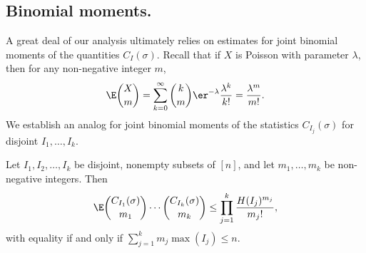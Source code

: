 \subsection{Binomial moments.}
A great deal of our analysis ultimately relies on
estimates for joint binomial moments of the quantities
$C_I(\sigma)$.  Recall that if $X$
is Poisson with parameter $\lambda$,
then for any non-negative integer $m$,
\[
\E \binom{X}{m} = 
\sum_{k=0}^\infty \binom{k}{m} \er^{-\lambda} \frac{\lambda^k}{k!}= \frac{\lambda^m}{m!}.
\]
We establish an analog for joint binomial moments of the statistics
$C_{I_j}(\sigma)$ for disjoint $I_1,\ldots,I_k$.

\begin{thm}\label{cycles_sets_expectation}
Let $I_1,I_2, \ldots, I_k$ be disjoint, nonempty subsets of $[n]$, and let
$m_1,\ldots,m_k$ be non-negative integers.  Then
\[
\E \binom{C_{I_1}(\sigma)}{m_1} \cdots \binom{C_{I_k}(\sigma)}{m_k} \le \prod_{j=1}^k \frac{H(I_j)^{m_j}}{m_j!},
\]
with equality if and only if $\sum_{j=1}^k m_j \max(I_j) \le n$.
\end{thm}
